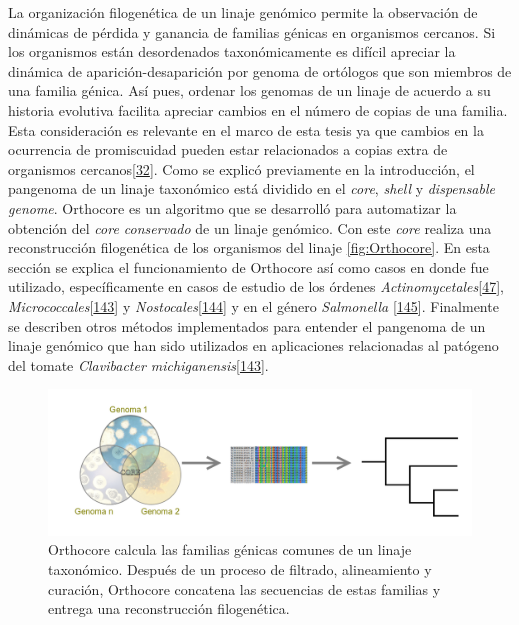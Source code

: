 \documentclass[12pt,twoside]{reedthesis}
\begin{document}
  La organización filogenética de un linaje genómico permite la
  observación de dinámicas de pérdida y ganancia de familias génicas en
  organismos cercanos. Si los organismos están desordenados
  taxonómicamente es difícil apreciar la dinámica de
  aparición-desaparición por genoma de ortólogos que son miembros de una
  familia génica. Así pues, ordenar los genomas de un linaje de acuerdo a
  su historia evolutiva facilita apreciar cambios en el número de copias
  de una familia. Esta consideración es relevante en el marco de esta
  tesis ya que cambios en la ocurrencia de promiscuidad pueden estar
  relacionados a copias extra de organismos
  cercanos{[}\protect\hyperlink{ref-verdel-aranda_molecular_2015}{32}{]}.
  Como se explicó previamente en la introducción, el pangenoma de un
  linaje taxonómico está dividido en el \emph{core}, \emph{shell} y
  \emph{dispensable} \emph{genome}. Orthocore es un algoritmo que se
  desarrolló para automatizar la obtención del \emph{core conservado} de
  un linaje genómico. Con este \emph{core} realiza una reconstrucción
  filogenética de los organismos del linaje \autoref{fig:Orthocore}. En
  esta sección se explica el funcionamiento de Orthocore así como casos en
  donde fue utilizado, específicamente en casos de estudio de los órdenes
  \emph{Actinomycetales}{[}\protect\hyperlink{ref-juarez-vazquez_evolution_2017}{47}{]},
  \emph{Micrococcales}{[}\protect\hyperlink{ref-rodriguez_tesis_2016}{143}{]}
  y
  \emph{Nostocales}{[}\protect\hyperlink{ref-gutierrez-garcia_cycad_2019}{144}{]}
  y en el género \emph{Salmonella}
  {[}\protect\hyperlink{ref-delgado-suarez_whole_2018}{145}{]}. Finalmente
  se describen otros métodos implementados para entender el pangenoma de
  un linaje genómico que han sido utilizados en aplicaciones relacionadas
  al patógeno del tomate \emph{Clavibacter
  michiganensis}{[}\protect\hyperlink{ref-rodriguez_tesis_2016}{143}{]}.
  
  \begin{figure}[h!tbp]
  \centering
  \includegraphics[angle = 0,scale = .44]{chapter1/coreWiki.png}
  \caption[Orthocore calcula el $core~genome$ de un linaje y construye con él una filogenia]{\footnotesize{Orthocore calcula las familias génicas comunes de un linaje taxonómico. Después de un proceso de filtrado, alineamiento y curación, Orthocore concatena las secuencias de estas familias y entrega una reconstrucción filogenética.}}
  \label{fig:Orthocore}
  \end{figure}
  
\end{document}
